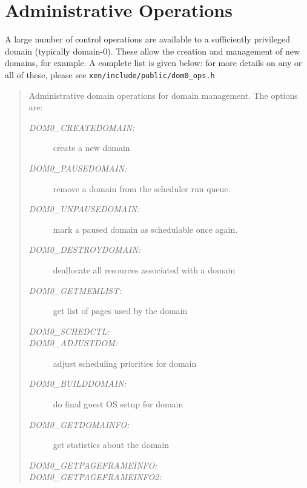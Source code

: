 \documentclass[11pt,twoside,final,openright]{xenstyle}
\begin{document}



\section{Administrative Operations}
\label{s:dom0ops}

A large number of control operations are available to a sufficiently
privileged domain (typically domain-0). These allow the creation and
management of new domains, for example. A complete list is given 
below: for more details on any or all of these, please see 
{\tt xen/include/public/dom0\_ops.h} 


\begin{quote}

Administrative domain operations for domain management. The options are:

\begin{description} 
\item [\it DOM0\_CREATEDOMAIN:] create a new domain

\item [\it DOM0\_PAUSEDOMAIN:] remove a domain from the scheduler run 
queue. 

\item [\it DOM0\_UNPAUSEDOMAIN:] mark a paused domain as schedulable
  once again. 

\item [\it DOM0\_DESTROYDOMAIN:] deallocate all resources associated
with a domain

\item [\it DOM0\_GETMEMLIST:] get list of pages used by the domain

\item [\it DOM0\_SCHEDCTL:]

\item [\it DOM0\_ADJUSTDOM:] adjust scheduling priorities for domain

\item [\it DOM0\_BUILDDOMAIN:] do final guest OS setup for domain

\item [\it DOM0\_GETDOMAINFO:] get statistics about the domain

\item [\it DOM0\_GETPAGEFRAMEINFO:] 

\item [\it DOM0\_GETPAGEFRAMEINFO2:]


\end{description}
\end{quote}
\end{document}
